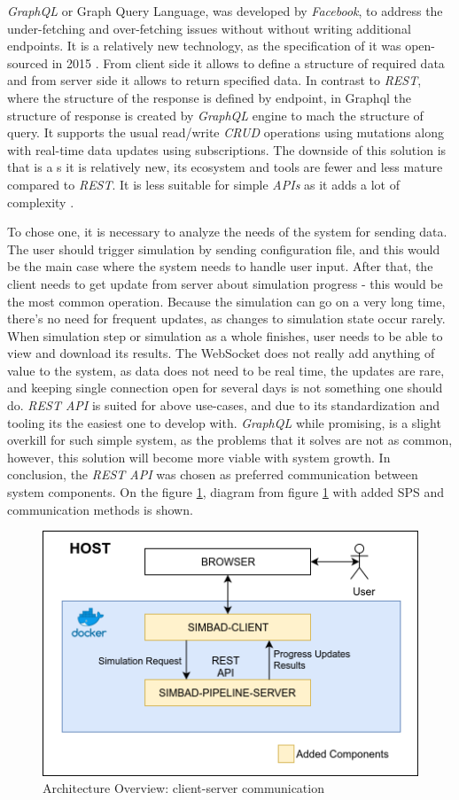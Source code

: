 \textit{GraphQL} or Graph Query Language, was developed by \textit{Facebook}, to address the under-fetching and over-fetching issues without without writing additional endpoints. It is a relatively new technology, as the specification of it was open-sourced in 2015 \cite{GraphQL}. From client side it allows to define a structure of required data and from server side it allows to return specified data. In contrast to \textit{REST}, where the structure of the response is defined by endpoint, in Graphql the structure of response is created by \textit{GraphQL} engine to mach the structure of query. It supports the usual read/write \textit{CRUD} operations using mutations along with real-time data updates using subscriptions. The downside of this solution is that is a s it is relatively new, its ecosystem and tools are fewer and less mature compared to \textit{REST}. It is less suitable for simple \textit{APIs} as it adds a lot of complexity \cite{GraphQlNoNeed}.

To chose one, it is necessary to analyze the needs of the system for sending data. The user should trigger simulation by sending configuration file, and this would be the main case where the system needs to handle user input. After that, the client needs to get update from server about simulation progress - this would be the most common operation. Because the simulation can go on a very long time, there's no need for frequent updates, as changes to simulation state occur rarely. When simulation step or simulation as a whole finishes, user needs to be able to view and download its results. The WebSocket does not really add anything of value to the system, as data does not need to be real time, the updates are rare, and keeping single connection open for several days is not something one should do. \textit{REST API} is suited for above use-cases, and due to its standardization and tooling its the easiest one to develop with. \textit{GraphQL} while promising, is a slight overkill for such simple system, as the problems that it solves are not as common, however, this solution will become more viable with system growth. In conclusion, the \textit{REST API} was chosen as preferred communication between system components. On the figure \ref{fig:arch2}, diagram from figure \ref{fig:arch2} with added SPS and communication methods is shown. 
\begin{figure}[h!]
	\centering
		\includegraphics[width=0.9\linewidth]{diagrams/arch2.png}
	\caption{Architecture Overview: client-server communication}
	\label{fig:arch2}
\end{figure}
\newpage 
